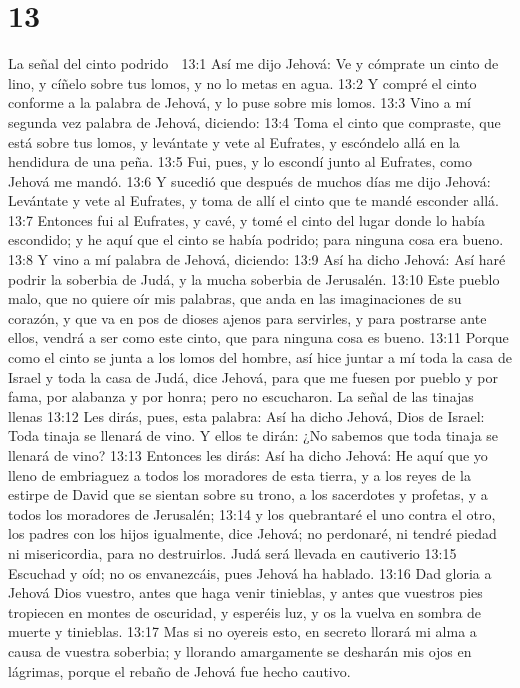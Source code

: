 \chapter{13}

La señal del cinto podrido  

13:1 Así me dijo Jehová: Ve y cómprate un cinto de lino, y cíñelo sobre tus lomos, y no lo metas en agua.  
13:2 Y compré el cinto conforme a la palabra de Jehová, y lo puse sobre mis lomos.  
13:3 Vino a mí segunda vez palabra de Jehová, diciendo:  
13:4 Toma el cinto que compraste, que está sobre tus lomos, y levántate y vete al Eufrates, y escóndelo allá en la hendidura de una peña.  
13:5 Fui, pues, y lo escondí junto al Eufrates, como Jehová me mandó.  
13:6 Y sucedió que después de muchos días me dijo Jehová: Levántate y vete al Eufrates, y toma de allí el cinto que te mandé esconder allá.  
13:7 Entonces fui al Eufrates, y cavé, y tomé el cinto del lugar donde lo había escondido; y he aquí que el cinto se había podrido; para ninguna cosa era bueno.  
13:8 Y vino a mí palabra de Jehová, diciendo:  
13:9 Así ha dicho Jehová: Así haré podrir la soberbia de Judá, y la mucha soberbia de Jerusalén. 
13:10 Este pueblo malo, que no quiere oír mis palabras, que anda en las imaginaciones de su corazón, y que va en pos de dioses ajenos para servirles, y para postrarse ante ellos, vendrá a ser como este cinto, que para ninguna cosa es bueno.  
13:11 Porque como el cinto se junta a los lomos del hombre, así hice juntar a mí toda la casa de Israel y toda la casa de Judá, dice Jehová, para que me fuesen por pueblo y por fama, por alabanza y por honra; pero no escucharon.  
La señal de las tinajas llenas  
13:12 Les dirás, pues, esta palabra: Así ha dicho Jehová, Dios de Israel: Toda tinaja se llenará de vino. Y ellos te dirán: ¿No sabemos que toda tinaja se llenará de vino?  
13:13 Entonces les dirás: Así ha dicho Jehová: He aquí que yo lleno de embriaguez a todos los moradores de esta tierra, y a los reyes de la estirpe de David que se sientan sobre su trono, a los sacerdotes y profetas, y a todos los moradores de Jerusalén;  
13:14 y los quebrantaré el uno contra el otro, los padres con los hijos igualmente, dice Jehová; no perdonaré, ni tendré piedad ni misericordia, para no destruirlos.  
Judá será llevada en cautiverio  
13:15 Escuchad y oíd; no os envanezcáis, pues Jehová ha hablado.  
13:16 Dad gloria a Jehová Dios vuestro, antes que haga venir tinieblas, y antes que vuestros pies tropiecen en montes de oscuridad, y esperéis luz, y os la vuelva en sombra de muerte y tinieblas.  
13:17 Mas si no oyereis esto, en secreto llorará mi alma a causa de vuestra soberbia; y llorando amargamente se desharán mis ojos en lágrimas, porque el rebaño de Jehová fue hecho cautivo.  
